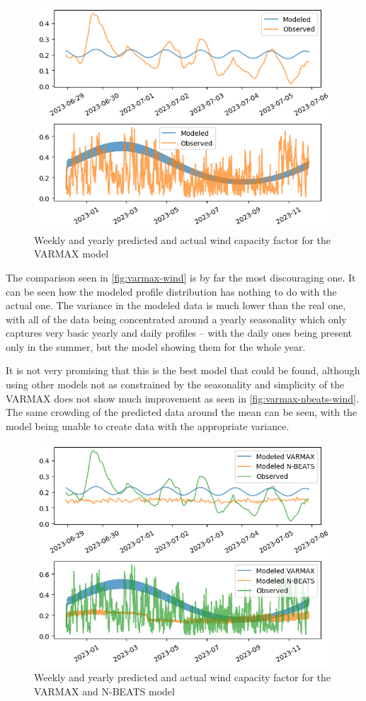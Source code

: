 \begin{figure}[ht]
    \centering
    \captionsetup{justification=centering}
    \includegraphics[width=0.7\linewidth]{assets/varmax-wind.png}
    \caption{Weekly and yearly predicted and actual wind capacity factor for the VARMAX model}
    \label{fig:varmax-wind}
\end{figure}
The comparison seen in \autoref{fig:varmax-wind} is by far the most discouraging one. It can be seen how the modeled profile distribution has nothing to do with the actual one. The variance in the modeled data is much lower than the real one, with all of the data being concentrated around a yearly seasonality which only captures very basic yearly and daily profiles -- with the daily ones being present only in the summer, but the model showing them for the whole year. 

It is not very promising that this is the best model that could be found, although using other models not as constrained by the seasonality and simplicity of the VARMAX does not show much improvement as seen in \autoref{fig:varmax-nbeats-wind}. The same crowding of the predicted data around the mean can be seen, with the model being unable to create data with the appropriate variance. 
\newpage
\begin{figure}[ht]
    \centering
    \captionsetup{justification=centering}
    \includegraphics[width=0.7\linewidth]{assets/varmax-nbeats-wind.png}
    \caption{Weekly and yearly predicted and actual wind capacity factor for the VARMAX and N-BEATS model}
    \label{fig:varmax-nbeats-wind}
\end{figure}

